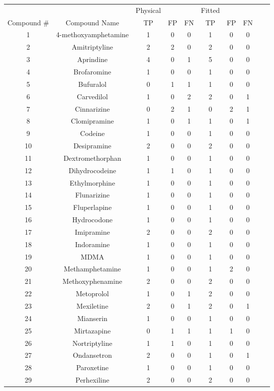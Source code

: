 \begin{table}[h]
\singlespace
\footnotesize
\centering
\begin{tabular}{cccccccccc}
\hline
	&	&Physical	&	&	&Fitted	&	&	&	&\\
Compound \#	&Compound Name	&TP	&FP	&FN	&TP	&FP	&FN	&	&\\
\hline
1	&4-methoxyamphetamine	&1	&0	&0	&1	&0	&0	&	&\\
2	&Amitriptyline	&2	&2	&0	&2	&0	&0	&	&\\
3	&Aprindine	&4	&0	&1	&5	&0	&0	&	&\\
4	&Brofaromine	&1	&0	&0	&1	&0	&0	&	&\\
5	&Bufuralol	&0	&1	&1	&1	&0	&0	&	&\\
6	&Carvedilol	&1	&0	&2	&2	&0	&1	&	&\\
7	&Cinnarizine	&0	&2	&1	&0	&2	&1	&	&\\
8	&Clomipramine	&1	&0	&1	&1	&0	&1	&	&\\
9	&Codeine	&1	&0	&0	&1	&0	&0	&	&\\
10	&Desipramine	&2	&0	&0	&2	&0	&0	&	&\\
11	&Dextromethorphan	&1	&0	&0	&1	&0	&0	&	&\\
12	&Dihydrocodeine	&1	&1	&0	&1	&0	&0	&	&\\
13	&Ethylmorphine	&1	&0	&0	&1	&0	&0	&	&\\
14	&Flunarizine	&1	&0	&0	&1	&0	&0	&	&\\
15	&Fluperlapine	&1	&0	&0	&1	&0	&0	&	&\\
16	&Hydrocodone	&1	&0	&0	&1	&0	&0	&	&\\
17	&Imipramine	&2	&0	&0	&2	&0	&0	&	&\\
18	&Indoramine	&1	&0	&0	&1	&0	&0	&	&\\
19	&MDMA	&1	&0	&0	&1	&0	&0	&	&\\
20	&Methamphetamine	&1	&0	&0	&1	&2	&0	&	&\\
21	&Methoxyphenamine	&2	&0	&0	&2	&0	&0	&	&\\
22	&Metoprolol	&1	&0	&1	&2	&0	&0	&	&\\
23	&Mexiletine	&2	&0	&1	&2	&0	&1	&	&\\
24	&Mianserin	&1	&0	&0	&1	&0	&0	&	&\\
25	&Mirtazapine	&0	&1	&1	&1	&1	&0	&	&\\
26	&Nortriptyline	&1	&1	&0	&1	&0	&0	&	&\\
27	&Ondansetron	&2	&0	&0	&1	&0	&1	&	&\\
28	&Paroxetine	&1	&0	&0	&1	&0	&0	&	&\\
29	&Perhexiline	&2	&0	&0	&2	&0	&0	&	&\\

\end{tabular}
\end{table}
